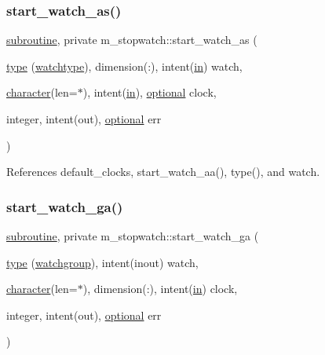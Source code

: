 \subsubsection{\texorpdfstring{start\+\_\+watch\+\_\+as()}{start\_watch\_as()}}
{\footnotesize\ttfamily \hyperlink{M__stopwatch_83_8txt_acfbcff50169d691ff02d4a123ed70482}{subroutine}, private m\+\_\+stopwatch\+::start\+\_\+watch\+\_\+as (\begin{DoxyParamCaption}\item[{\hyperlink{stop__watch_83_8txt_a70f0ead91c32e25323c03265aa302c1c}{type} (\hyperlink{structm__stopwatch_1_1watchtype}{watchtype}), dimension(\+:), intent(\hyperlink{M__journal_83_8txt_afce72651d1eed785a2132bee863b2f38}{in})}]{watch,  }\item[{\hyperlink{option__stopwatch_83_8txt_abd4b21fbbd175834027b5224bfe97e66}{character}(len=$\ast$), intent(\hyperlink{M__journal_83_8txt_afce72651d1eed785a2132bee863b2f38}{in}), \hyperlink{option__stopwatch_83_8txt_aa4ece75e7acf58a4843f70fe18c3ade5}{optional}}]{clock,  }\item[{integer, intent(out), \hyperlink{option__stopwatch_83_8txt_aa4ece75e7acf58a4843f70fe18c3ade5}{optional}}]{err }\end{DoxyParamCaption})\hspace{0.3cm}{\ttfamily [private]}}



References default\+\_\+clocks, start\+\_\+watch\+\_\+aa(), type(), and watch.

\mbox{\label{namespacem__stopwatch_a376a3381824a3edde6f1c96663035c58}} 
\subsubsection{\texorpdfstring{start\+\_\+watch\+\_\+ga()}{start\_watch\_ga()}}
{\footnotesize\ttfamily \hyperlink{M__stopwatch_83_8txt_acfbcff50169d691ff02d4a123ed70482}{subroutine}, private m\+\_\+stopwatch\+::start\+\_\+watch\+\_\+ga (\begin{DoxyParamCaption}\item[{\hyperlink{stop__watch_83_8txt_a70f0ead91c32e25323c03265aa302c1c}{type} (\hyperlink{structm__stopwatch_1_1watchgroup}{watchgroup}), intent(inout)}]{watch,  }\item[{\hyperlink{option__stopwatch_83_8txt_abd4b21fbbd175834027b5224bfe97e66}{character}(len=$\ast$), dimension(\+:), intent(\hyperlink{M__journal_83_8txt_afce72651d1eed785a2132bee863b2f38}{in})}]{clock,  }\item[{integer, intent(out), \hyperlink{option__stopwatch_83_8txt_aa4ece75e7acf58a4843f70fe18c3ade5}{optional}}]{err }\end{DoxyParamCaption})\hspace{0.3cm}{\ttfamily [private]}}



